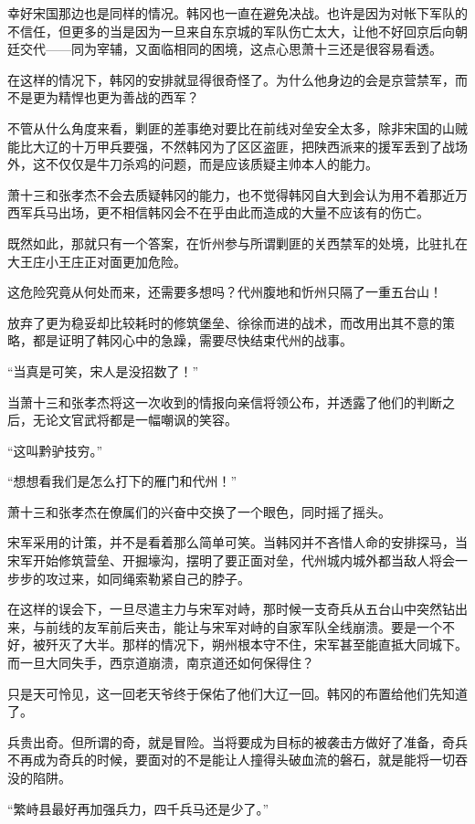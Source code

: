 幸好宋国那边也是同样的情况。韩冈也一直在避免决战。也许是因为对帐下军队的不信任，但更多的当是因为一旦来自东京城的军队伤亡太大，让他不好回京后向朝廷交代——同为宰辅，又面临相同的困境，这点心思萧十三还是很容易看透。

在这样的情况下，韩冈的安排就显得很奇怪了。为什么他身边的会是京营禁军，而不是更为精悍也更为善战的西军？

不管从什么角度来看，剿匪的差事绝对要比在前线对垒安全太多，除非宋国的山贼能比大辽的十万甲兵要强，不然韩冈为了区区盗匪，把陕西派来的援军丢到了战场外，这不仅仅是牛刀杀鸡的问题，而是应该质疑主帅本人的能力。

萧十三和张孝杰不会去质疑韩冈的能力，也不觉得韩冈自大到会认为用不着那近万西军兵马出场，更不相信韩冈会不在乎由此而造成的大量不应该有的伤亡。

既然如此，那就只有一个答案，在忻州参与所谓剿匪的关西禁军的处境，比驻扎在大王庄小王庄正对面更加危险。

这危险究竟从何处而来，还需要多想吗？代州腹地和忻州只隔了一重五台山！

放弃了更为稳妥却比较耗时的修筑堡垒、徐徐而进的战术，而改用出其不意的策略，都是证明了韩冈心中的急躁，需要尽快结束代州的战事。

“当真是可笑，宋人是没招数了！”

当萧十三和张孝杰将这一次收到的情报向亲信将领公布，并透露了他们的判断之后，无论文官武将都是一幅嘲讽的笑容。

“这叫黔驴技穷。”

“想想看我们是怎么打下的雁门和代州！”

萧十三和张孝杰在僚属们的兴奋中交换了一个眼色，同时摇了摇头。

宋军采用的计策，并不是看着那么简单可笑。当韩冈并不吝惜人命的安排探马，当宋军开始修筑营垒、开掘壕沟，摆明了要正面对垒，代州城内城外都当敌人将会一步步的攻过来，如同绳索勒紧自己的脖子。

在这样的误会下，一旦尽遣主力与宋军对峙，那时候一支奇兵从五台山中突然钻出来，与前线的友军前后夹击，能让与宋军对峙的自家军队全线崩溃。要是一个不好，被歼灭了大半。那样的情况下，朔州根本守不住，宋军甚至能直抵大同城下。而一旦大同失手，西京道崩溃，南京道还如何保得住？

只是天可怜见，这一回老天爷终于保佑了他们大辽一回。韩冈的布置给他们先知道了。

兵贵出奇。但所谓的奇，就是冒险。当将要成为目标的被袭击方做好了准备，奇兵不再成为奇兵的时候，要面对的不是能让人撞得头破血流的磐石，就是能将一切吞没的陷阱。

“繁峙县最好再加强兵力，四千兵马还是少了。”


